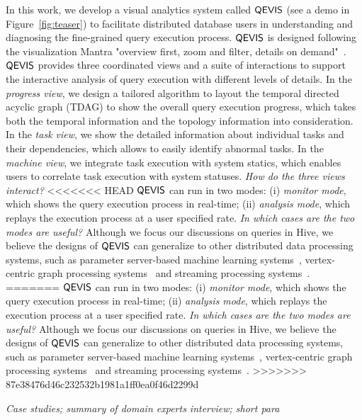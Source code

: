 In this work, we develop a visual analytics system called $\mathsf{QEVIS}$ (see a demo in Figure~\ref{fig:teaser}) to facilitate distributed database users in understanding and diagnosing the fine-grained query execution process. $\mathsf{QEVIS}$ is designed following the visualization Mantra "overview first, zoom and filter, details on demand"~\cite{shneiderman2003eyes}. $\mathsf{QEVIS}$ provides three coordinated views and a suite of interactions to support the interactive analysis of query execution with different levels of details. In the \textit{progress view}, we design a tailored algorithm to layout the temporal directed acyclic graph (TDAG) to show the overall query execution progress, which takes both the temporal information and the topology information into consideration. In the \textit{task view}, we show the detailed information about individual tasks and their dependencies, which allows to easily identify abnormal tasks. In the \textit{machine view}, we integrate task execution with system statics, which enables users to correlate task execution with system statuses.\textit{ How do the three views interact?}
<<<<<<< HEAD
$\mathsf{QEVIS}$ can run in two modes: (i) \textit{monitor mode}, which shows the query execution process in real-time; (ii) \textit{analysis mode}, which replays the execution process at a user specified rate. \textit{ In which cases are the two modes are useful?} Although we focus our discussions on queries in Hive, we believe the designs of $\mathsf{QEVIS}$ can generalize to other distributed data processing systems, such as parameter server-based machine learning systems~\cite{}, vertex-centric graph processing systems~\cite{} and streaming processing systems~\cite{}.   
=======
$\mathsf{QEVIS}$ can run in two modes: (i) \textit{monitor mode}, which shows the query execution process in real-time; (ii) \textit{analysis mode}, which replays the execution process at a user specified rate. \textit{ In which cases are the two modes are useful?} Although we focus our discussions on queries in Hive, we believe the designs of $\mathsf{QEVIS}$ can generalize to other distributed data processing systems, such as parameter server-based machine learning systems~\cite{}, vertex-centric graph processing systems~\cite{} and streaming processing systems~\cite{carbone2015apache}.   
>>>>>>> 87e38476d46c232532b1981a1ff0ea0f46d2299d

\textit{Case studies; summary of domain experts interview; short para}

